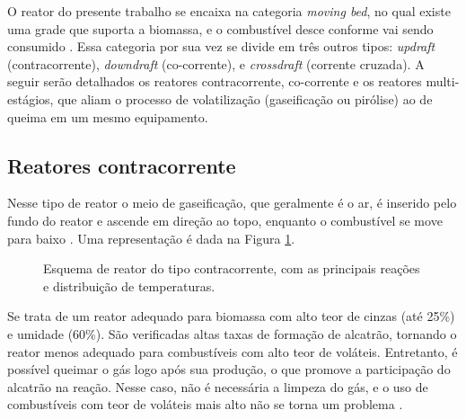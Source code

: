 O reator do presente trabalho se encaixa na categoria \textit{moving bed}, no qual existe uma grade que suporta a biomassa, e o combustível desce conforme vai sendo consumido \cite{Basu}. Essa categoria por sua vez se divide em três outros tipos: \textit{updraft} (contracorrente), \textit{downdraft} (co-corrente), e \textit{crossdraft} (corrente cruzada). A seguir serão detalhados os reatores contracorrente, co-corrente e os reatores multi-estágios, que aliam o processo de volatilização (gaseificação ou pirólise) ao de queima em um mesmo equipamento.

\subsection{Reatores contracorrente}
Nesse tipo de reator o meio de gaseificação, que geralmente é o ar, é inserido pelo fundo do reator e ascende em direção ao topo, enquanto o combustível se move para baixo \cite{Basu}. Uma representação é dada na Figura \ref{fig:updraft}.

\begin{figure}[!ht]
	\centering
	\caption{Esquema de reator do tipo contracorrente, com as principais reações e distribuição de temperaturas.}
	\label{fig:updraft}
\end{figure}

Se trata de um reator adequado para biomassa com alto teor de cinzas (até 25\%) e umidade (60\%). São verificadas altas taxas de formação de alcatrão, tornando o reator menos adequado para combustíveis com alto teor de voláteis. Entretanto, é possível queimar o gás logo após sua produção, o que promove a participação do alcatrão na reação. Nesse caso, não é necessária a limpeza do gás, e o uso de combustíveis com teor de voláteis mais alto não se torna um problema \cite{Basu}.

